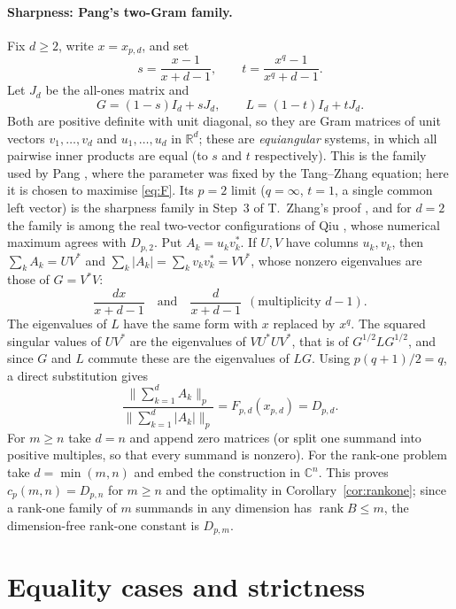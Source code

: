 \documentclass[11pt,a4paper]{article}
\numberwithin{equation}{section}
\theoremstyle{definition}
\theoremstyle{remark}
\DeclareMathOperator{\rank}{rank}
\newcommand{\C}{\mathbb C}
\newcommand{\R}{\mathbb R}
\begin{document}
\paragraph{Sharpness: Pang's two-Gram family.}
Fix \(d\ge2\), write \(x=x_{p,d}\), and set
\[
 s=\frac{x-1}{x+d-1},\qquad t=\frac{x^q-1}{x^q+d-1}.
\]
Let \(J_d\) be the all-ones matrix and
\begin{equation}\label{eq:twoGram}
 G=(1-s)I_d+sJ_d,\qquad L=(1-t)I_d+tJ_d .
\end{equation}
Both are positive definite with unit diagonal, so they are Gram matrices
of unit vectors \(v_1,\ldots,v_d\) and \(u_1,\ldots,u_d\) in \(\R^d\);
these are \emph{equiangular} systems, in which all pairwise inner products
are equal (to \(s\) and \(t\) respectively). This is the family used by
Pang \cite{Pang}, where the parameter was fixed by the Tang--Zhang
equation; here it is chosen to maximise \eqref{eq:F}. Its \(p=2\) limit
(\(q=\infty\), \(t=1\), a single common left vector) is the sharpness
family in Step~3 of T.~Zhang's proof \cite[Theorem 6.2]{Zhang}, and for
\(d=2\) the family is among the real two-vector configurations of Qiu
\cite[Section 5]{Qiu}, whose numerical maximum agrees with \(D_{p,2}\). Put
\(A_k=u_kv_k^*\). If \(U,V\) have columns \(u_k,v_k\), then
\(\sum_kA_k=UV^*\) and \(\sum_k|A_k|=\sum_kv_kv_k^*=VV^*\), whose nonzero
eigenvalues are those of \(G=V^*V\):
\[
 \frac{dx}{x+d-1}\quad\text{and}\quad
 \frac{d}{x+d-1}\ \ (\text{multiplicity }d-1).
\]
The eigenvalues of \(L\) have the same form with \(x\) replaced by
\(x^q\). The squared singular values of \(UV^*\) are the eigenvalues of
\(VU^*UV^*\), that is of \(G^{1/2}LG^{1/2}\), and since \(G\) and \(L\)
commute these are the eigenvalues of \(LG\). Using \(p(q+1)/2=q\), a
direct substitution gives
\begin{equation}\label{eq:sharpconstruction}
 \frac{\|\sum_{k=1}^{d}A_k\|_p}{\|\sum_{k=1}^{d}|A_k|\|_p}
 =F_{p,d}(x_{p,d})=D_{p,d}.
\end{equation}
For \(m\ge n\) take \(d=n\) and append zero matrices (or split one
summand into positive multiples, so that every summand is nonzero). For
the rank-one problem take \(d=\min(m,n)\) and embed the construction in
\(\C^n\). This proves \(c_p(m,n)=D_{p,n}\) for \(m\ge n\) and the
optimality in Corollary~\ref{cor:rankone}; since a rank-one family of
\(m\) summands in any dimension has \(\rank B\le m\), the dimension-free
rank-one constant is \(D_{p,m}\).

\section{Equality cases and strictness}\label{sec:equality}
\end{document}
